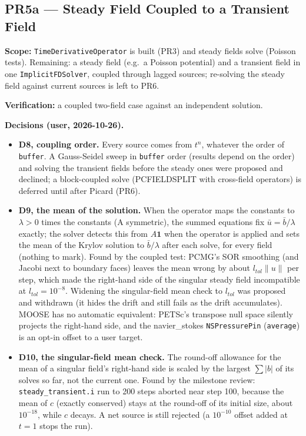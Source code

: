 \documentclass[11pt]{article}
\newcommand{\pr}[2]{\subsection{PR#1 --- #2}}
\begin{document}
\pr{5a}{Steady Field Coupled to a Transient Field}
\textbf{Scope:} \texttt{TimeDerivativeOperator} is built (PR3) and steady
fields solve (Poisson tests). Remaining: a steady field (e.g.\ a Poisson
potential) and a transient field in one \texttt{ImplicitFDSolver}, coupled
through lagged sources; re-solving the steady field against current
sources is left to PR6.

\textbf{Verification:} a coupled two-field case against an independent
solution.

\textbf{Decisions (user, 2026-10-26).}
\begin{itemize}
\item \textbf{D8, coupling order.} Every source comes from $t^n$, whatever the
  order of \texttt{buffer}. A Gauss-Seidel sweep in \texttt{buffer} order
  (results depend on the order) and solving the transient fields before the
  steady ones were proposed and declined; a block-coupled solve
  (PCFIELDSPLIT with cross-field operators) is deferred until after Picard
  (PR6).
\item \textbf{D9, the mean of the solution.} When the operator maps the
  constants to $\lambda > 0$ times the constants (A symmetric), the summed
  equations fix $\bar u = \bar b / \lambda$ exactly; the solver detects this
  from $A\mathbf{1}$ when the operator is applied and sets the mean of the
  Krylov solution to $\bar b/\lambda$ after each solve, for every field
  (nothing to mark). Found by the coupled test: PCMG's SOR smoothing (and Jacobi
  next to boundary faces) leaves the mean wrong by about $l_{tol}\|u\|$ per
  step, which made the right-hand side of the singular steady field
  incompatible at $l_{tol} = 10^{-8}$. Widening the singular-field mean check
  to $l_{tol}$ was proposed and withdrawn (it hides the drift and still fails
  as the drift accumulates). MOOSE has no automatic equivalent: PETSc's
  transpose null space silently projects the right-hand side, and the
  navier\_stokes \texttt{NSPressurePin} (\texttt{average}) is an opt-in
  offset to a user target.
\item \textbf{D10, the singular-field mean check.} The round-off allowance for
  the mean of a singular field's right-hand side is scaled by the largest
  $\sum|b|$ of its solves so far, not the current one. Found by the milestone
  review: \texttt{steady\_transient.i} run to 200 steps aborted near step
  100, because the mean of $c$ (exactly conserved) stays at the round-off of its
  initial size, about $10^{-18}$, while $c$ decays. A net source is still
  rejected (a $10^{-10}$ offset added at $t = 1$ stops the run).
\end{itemize}
\end{document}
